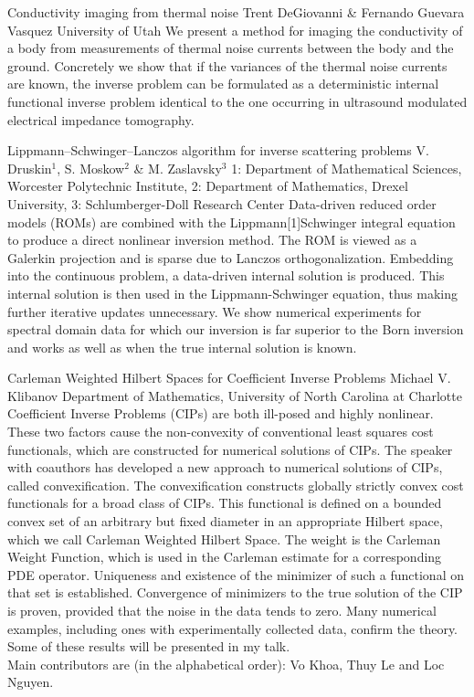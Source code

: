 \begin{addmargin}[2em]{0em}
\vspace{1.5ex}
\abs
{Conductivity imaging from thermal noise}
{Trent DeGiovanni \& Fernando Guevara Vasquez}
{University of Utah}
{We present a method for imaging the conductivity of a body from measurements of thermal noise currents between the body and the ground. Concretely we show that if the variances of the thermal noise currents are known, the inverse problem can be formulated as a deterministic internal functional inverse problem identical to the one occurring in ultrasound modulated electrical impedance tomography.}


\vspace{1.5ex}
\abs
{{L}ippmann--{S}chwinger--{L}anczos algorithm for inverse scattering problems}
{V. Druskin$^{1}$, S. Moskow$^{2}$ \& M. Zaslavsky$^{3}$}
{1: Department of Mathematical Sciences, Worcester Polytechnic Institute, 2: Department of Mathematics, Drexel University, 3: Schlumberger-Doll Research Center}
{Data-driven reduced order models (ROMs) are combined with the Lippmann[1]Schwinger integral equation to produce a direct nonlinear inversion method. The ROM is viewed as a Galerkin projection and is sparse due to Lanczos orthogonalization. Embedding into the continuous problem, a data-driven internal solution is produced. This internal solution is then used in the Lippmann-Schwinger equation, thus making further iterative updates unnecessary. We show numerical experiments for spectral domain data for which our inversion is far superior to the Born inversion and works as well as when the true internal solution is known.}




\vspace{1.5ex}
\abs
{Carleman Weighted Hilbert Spaces for Coefficient Inverse Problems}
{Michael V. Klibanov}
{Department of Mathematics, University of North Carolina at Charlotte}
{Coefficient Inverse Problems (CIPs) are both ill-posed and highly nonlinear. These two factors cause the non-convexity of conventional least squares cost functionals, which are constructed for numerical solutions of CIPs. The speaker with coauthors has developed a new approach to numerical solutions of CIPs, called convexification. The convexification constructs globally strictly convex cost functionals for a broad class of CIPs. This functional is defined on a bounded convex set of an arbitrary but fixed diameter in an appropriate Hilbert space, which we call Carleman Weighted Hilbert Space. The weight is the Carleman Weight Function, which is used in the Carleman estimate for a corresponding PDE operator. Uniqueness and existence of the minimizer of such a functional on that set is established. Convergence of minimizers to the true solution of the CIP is proven, provided that the noise in the data tends to zero. Many numerical examples, including ones with experimentally collected data, confirm the theory.\\
Some of these results will be presented in my talk.\\
Main contributors are (in the alphabetical order): Vo Khoa, Thuy Le and Loc Nguyen.}



\end{addmargin}
